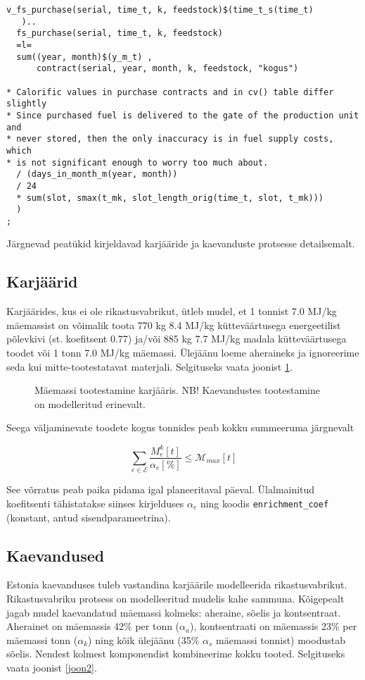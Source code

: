 \documentclass[10pt,a4paper]{article}
\begin{document}
\begin{verbatim}
v_fs_purchase(serial, time_t, k, feedstock)$(time_t_s(time_t)
   )..
  fs_purchase(serial, time_t, k, feedstock)
  =l=
  sum((year, month)$(y_m_t) ,
      contract(serial, year, month, k, feedstock, "kogus")

* Calorific values in purchase contracts and in cv() table differ slightly
* Since purchased fuel is delivered to the gate of the production unit and
* never stored, then the only inaccuracy is in fuel supply costs, which
* is not significant enough to worry too much about.
  / (days_in_month_m(year, month))
  / 24
  * sum(slot, smax(t_mk, slot_length_orig(time_t, slot, t_mk)))
  )
;
\end{verbatim}

Järgnevad peatükid kirjeldavad karjääride ja kaevanduste protsesse detailsemalt.

\subsection{Karjäärid}
Karjäärides, kus ei ole rikastusvabrikut, ütleb mudel, et 1 tonnist 7.0 MJ/kg mäemassist on võimalik toota 770 kg 8.4 MJ/kg kütteväärtusega energeetilist põlevkivi (st. koefitsent 0.77) ja/või 885 kg 7.7 MJ/kg madala kütteväärtusega toodet või 1 tonn 7.0 MJ/kg mäemassi. Ülejäänu loeme aheraineks ja ignoreerime seda kui mitte-tootestatavat materjali. Selgituseks vaata joonist \ref{joon1}.

\begin{figure}

\caption{Mäemassi tootestamine karjääris. NB! Kaevandustes tootestamine on modelleritud erinevalt.
\label{joon1}}
\end{figure}

Seega väljaminevate toodete kogus tonnides peab kokku summeeruma järgne\-valt

\begin{equation}
\sum_{e \in \mathcal{E}} \frac{M^k_{e} [t]}{\mathit{\alpha}_e [\%]} \le \mathcal{M}_{max} [t]
\end{equation}

See võrratus peab paika pidama igal planeeritaval päeval. Ülalmainitud koefitsenti tähistatakse siinses kirjelduses $\mathit{\alpha}_e$ ning koodis \texttt{enrichment\_coef} (konstant, antud sisendparameetrina).

\subsection{Kaevandused}
Estonia kaevanduses tuleb vastandina karjäärile modelleerida rikastusvabrikut. Rikastusvabriku protsess on modelleeritud mudelis kahe sammuna. Kõigepealt jagab mudel kaevandatud mäemassi kolmeks: aheraine, sõelis ja kontsentraat. Aherainet on mäemassis 42\% per tonn ($\mathit{\alpha_a}$), kontsentraati on mäemassis 23\% per mäemassi tonn ($\mathit{\alpha_k}$) ning kõik ülejäänu (35\% $\mathit{\alpha_s}$ mäemassi tonnist) moodustab sõelis. Nendest kolmest komponendist kombineerime kokku tooted. Selgituseks vaata joonist \ref{joon2}.
\end{document}
